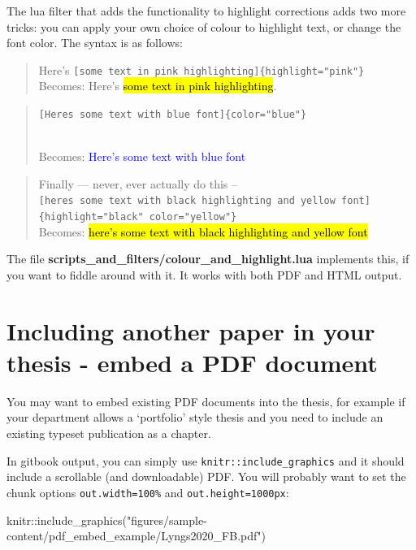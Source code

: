 \documentclass[a4paper, twoside]{templates/ociamthesis}
\newenvironment{Shaded}{\begin{snugshade}}{\end{snugshade}}
\newcommand{\FunctionTok}[1]{\textcolor[rgb]{0.00,0.00,0.00}{#1}}
\newcommand{\NormalTok}[1]{#1}
\newcommand{\SpecialCharTok}[1]{\textcolor[rgb]{0.00,0.00,0.00}{#1}}
\newcommand{\StringTok}[1]{\textcolor[rgb]{0.31,0.60,0.02}{#1}}
\renewenvironment{Shaded}
{
  \vspace{10pt}%
  \begin{snugshade}%
}{%
  \end{snugshade}%
  \vspace{8pt}%
}
\begin{document}
The lua filter that adds the functionality to highlight corrections adds two more tricks:
you can apply your own choice of colour to highlight text, or change the font color.
The syntax is as follows:

\begin{quote}
Here's \texttt{{[}some\ text\ in\ pink\ highlighting{]}\{highlight="pink"\}}\\
Becomes: Here's \hl{some text in pink highlighting}.
\end{quote}

\begin{quote}
\texttt{{[}Here\textquotesingle{}s\ some\ text\ with\ blue\ font{]}\{color="blue"\}}\strut \\
Becomes: \textcolor{blue}{Here's some text with blue font}
\end{quote}

\begin{quote}
Finally --- never, ever actually do this -- \texttt{{[}here\textquotesingle{}s\ some\ text\ with\ black\ highlighting\ and\ yellow\ font{]}\{highlight="black"\ color="yellow"\}}\\
Becomes: \textcolor{yellow}{\hl{here's some text with black highlighting and yellow font}}
\end{quote}

The file \textbf{scripts\_and\_filters/colour\_and\_highlight.lua} implements this, if you want to fiddle around with it.
It works with both PDF and HTML output.

\hypertarget{embed-pdf}{%
\section{Including another paper in your thesis - embed a PDF document}\label{embed-pdf}}

You may want to embed existing PDF documents into the thesis, for example if your department allows a `portfolio' style thesis and you need to include an existing typeset publication as a chapter.

In gitbook output, you can simply use \texttt{knitr::include\_graphics} and it should include a scrollable (and downloadable) PDF.
You will probably want to set the chunk options \texttt{out.width=\textquotesingle{}100\%\textquotesingle{}} and \texttt{out.height=\textquotesingle{}1000px\textquotesingle{}}:

\begin{Shaded}
\begin{Highlighting}[]
\NormalTok{knitr}\SpecialCharTok{::}\FunctionTok{include\_graphics}\NormalTok{(}\StringTok{"figures/sample{-}content/pdf\_embed\_example/Lyngs2020\_FB.pdf"}\NormalTok{)}
\end{Highlighting}
\end{Shaded}
\end{document}
